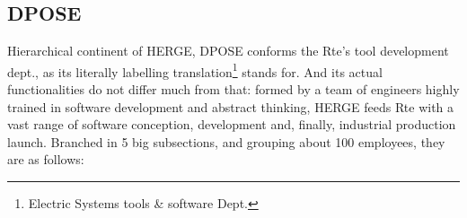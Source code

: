 
\subsection{DPOSE}
\label{subsec:Intro:thesis-purpose:DPOSE}

Hierarchical continent of HERGE, DPOSE conforms the Rte's tool development dept., as its literally labelling translation\footnote{Electric Systems tools \& software Dept.} stands for. And its actual functionalities do not differ much from that: formed by a team of engineers highly trained in software development and abstract thinking, HERGE feeds Rte with a vast range of software conception, development and, finally, industrial production launch. Branched in 5 big subsections, and grouping about 100 employees, they are as follows:




